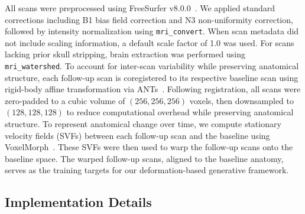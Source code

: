 All scans were preprocessed using FreeSurfer v8.0.0~\cite{fischl2012freesurfer}. We applied standard corrections including B1 bias field correction and N3 non-uniformity correction, followed by intensity normalization using \texttt{mri\_convert}. When scan metadata did not include scaling information, a default scale factor of 1.0 was used. For scans lacking prior skull stripping, brain extraction was performed using \texttt{mri\_watershed}. To account for inter-scan variability while preserving anatomical structure, each follow-up scan is coregistered to its respective baseline scan using rigid-body affine transformation via ANTs~\cite{avants2008ants}. Following registration, all scans were zero-padded to a cubic volume of $(256, 256, 256)$ voxels, then downsampled to $(128, 128, 128)$ to reduce computational overhead while preserving anatomical structure. To represent anatomical change over time, we compute stationary velocity fields (SVFs) between each follow-up scan and the baseline using VoxelMorph~\cite{balakrishnan2019voxelmorph,dalca2018unsupervised}. These SVFs were then used to warp the follow-up scans onto the baseline space. The warped follow-up scans, aligned to the baseline anatomy, serves as the training targets for our deformation-based generative framework.





\subsection{Implementation Details}
\label{sec:implementation}

